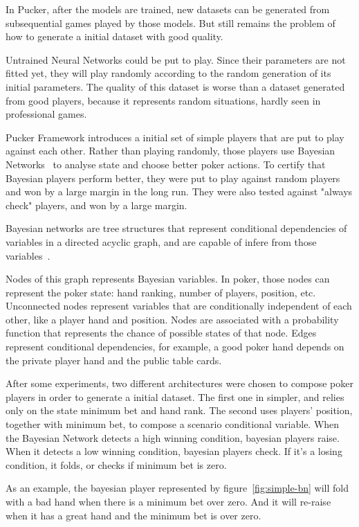 In Pucker, after the models are trained, new datasets can be generated from subsequential games played by those models. But still remains the problem of how to generate a initial dataset with good quality.

Untrained Neural Networks could be put to play. Since their parameters are not fitted yet, they will play randomly according to the random generation of its initial parameters. The quality of this dataset is worse than a dataset generated from good players, because it represents random situations, hardly seen in professional games.

Pucker Framework introduces a initial set of simple players that are put to play against each other. Rather than playing randomly, those players use Bayesian Networks~\cite{Heckerman1998} to analyse state and choose better poker actions. To certify that Bayesian players perform better, they were put to play against random players and won by a large margin in the long run. They were also tested against "always check" players, and won by a large margin.

Bayesian networks are tree structures that represent conditional dependencies of variables in a directed acyclic graph, and are capable of infere from those variables~\cite{Neapolitan2003}.

Nodes of this graph represents Bayesian variables. In poker, those nodes can represent the poker state: hand ranking, number of players, position, etc. Unconnected nodes represent variables that are conditionally independent of each other, like a player hand and position. Nodes are associated with a probability function that represents the chance of possible states of that node. Edges represent conditional dependencies, for example, a good poker hand depends on the private player hand and the public table cards.

After some experiments, two different architectures were chosen to compose poker players in order to generate a initial dataset. The first one in simpler, and relies only on the state minimum bet and hand rank. The second uses players' position, together with minimum bet, to compose a scenario conditional variable. When the Bayesian Network detects a high winning condition, bayesian players raise. When it detects a low winning condition, bayesian players check. If it's a losing condition, it folds, or checks if minimum bet is zero.

As an example, the bayesian player represented by figure~\ref{fig:simple-bn} will fold with a bad hand when there is a minimum bet over zero. And it will re-raise when it has a great hand and the minimum bet is over zero.

